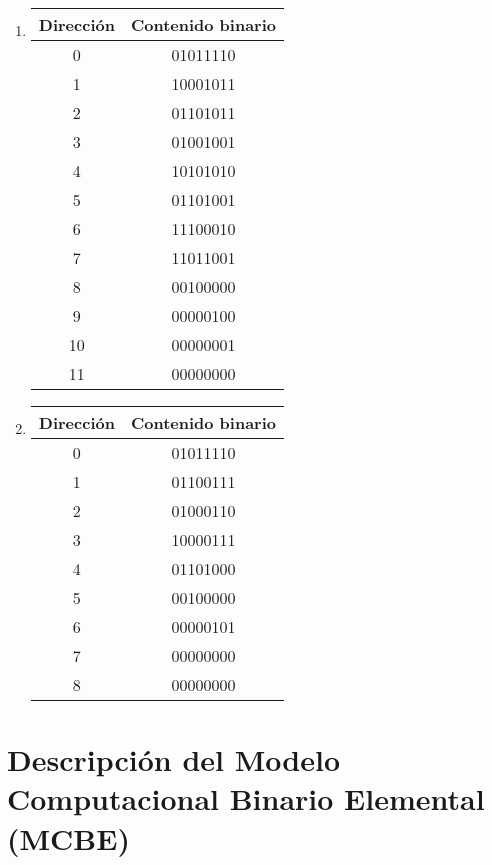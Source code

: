 \documentclass[12pt]{article}
\begin{document}
\begin{enumerate}
\item \begin{tabular}{| c | c |}
        \hline
        \textbf{Dirección}&\textbf{Contenido binario}\\
        \hline \hline
        0 & 01011110\\ \hline
        1 & 10001011\\ \hline
        2 & 01101011\\ \hline
        3 & 01001001\\ \hline
        4 & 10101010\\ \hline
        5 & 01101001\\ \hline
        6 & 11100010\\ \hline
        7 & 11011001\\ \hline
        8 & 00100000\\ \hline
        9 & 00000100\\ \hline
        10 & 00000001\\ \hline
        11 & 00000000\\ \hline
\end{tabular}

\item \begin{tabular}{| c | c |}
        \hline
        \textbf{Dirección}&\textbf{Contenido binario}\\
        \hline \hline
        0 & 01011110\\ \hline
        1 & 01100111\\ \hline
        2 & 01000110\\ \hline
        3 & 10000111\\ \hline
        4 & 01101000\\ \hline
        5 & 00100000\\ \hline
        6 & 00000101\\ \hline
        7 & 00000000\\ \hline
        8 & 00000000\\ \hline
\end{tabular}

\end{enumerate}

\appendix
\clearpage
\addappheadtotoc
\appendixpage

\section*{Descripción del Modelo Computacional Binario Elemental (MCBE)}
\end{document}
